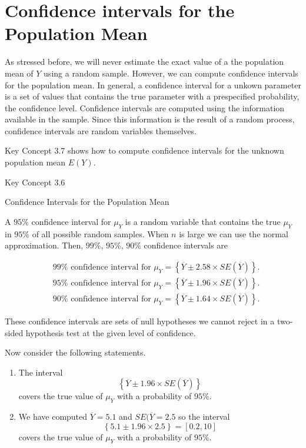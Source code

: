 \documentclass[]{book}
\theoremstyle{definition}
\theoremstyle{definition}
\theoremstyle{definition}
\theoremstyle{remark}
\begin{document}
\section{Confidence intervals for the Population
Mean}\label{confidence-intervals-for-the-population-mean}

As stressed before, we will never estimate the exact value of a the
population mean of \(Y\) using a random sample. However, we can compute
confidence intervals for the population mean. In general, a confidence
interval for a unkown parameter is a set of values that contains the
true parameter with a prespecified probability, the confidence level.
Confidence intervals are computed using the information available in the
sample. Since this information is the result of a random process,
confidence intervals are random variables themselves.

Key Concept 3.7 shows how to compute confidence intervals for the
unknown population mean \(E(Y)\).

Key Concept 3.6

Confidence Intervals for the Population Mean

A \(95\%\) confidence interval for \(\mu_Y\) is a random variable that
contains the true \(\mu_Y\) in \(95\%\) of all possible random samples.
When \(n\) is large we can use the normal approximation. Then, \(99\%\),
\(95\%\), \(90\%\) confidence intervals are

\begin{align}
&99\%\text{ confidence interval for } \mu_Y = \left\{ \overline{Y} \pm 2.58 \times SE(\overline{Y}) \right\}. \\
&95\%\text{ confidence interval for } \mu_Y = \left\{ \overline{Y} \pm 1.96 \times SE(\overline{Y}) \right\}. \\
&90\%\text{ confidence interval for } \mu_Y = \left\{ \overline{Y} \pm 1.64 \times SE(\overline{Y}) \right\}.
\end{align}

These confidence intervals are sets of null hypotheses we cannot reject
in a two-sided hypothesis test at the given level of confidence.

Now consider the following statements.

\begin{enumerate}
\def\labelenumi{\arabic{enumi}.}
\item
  The interval
  \[ \left\{ \overline{Y} \pm 1.96 \times SE(\overline{Y}) \right\} \]
  covers the true value of \(\mu_Y\) with a probability of \(95\%\).
\item
  We have computed \(\overline{Y} = 5.1\) and \(SE(\overline{Y}=2.5\) so
  the interval
  \[ \left\{ 5.1  \pm 1.96 \times 2.5 \right\} = \left[0.2,10\right] \]
  covers the true value of \(\mu_Y\) with a probability of \(95\%\).
\end{enumerate}
\end{document}
